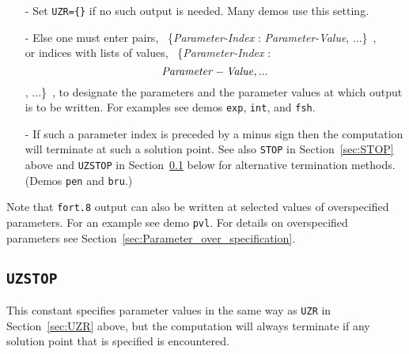 \documentclass[12pt]{report}
\begin{document}
\begin{itemize}
\item[-]
 Set {\tt UZR=\{\}} if no such output is needed. Many demos use this setting.
\item[-]
 Else one must enter pairs,
            ~\{{\it Parameter-Index} : {\it Parameter-Value}, ...\}~,\\
 or indices with lists of values,
            ~\{{\it Parameter-Index} : \[{\it Parameter-Value}, ...\], ...\}~,
 to designate the parameters and the parameter
 values at which output is to be written.
 For examples see demos {\tt exp}, {\tt int}, and {\tt fsh}.
\item[-]
 If such a parameter index is preceded by a minus sign then the computation will
 terminate at such a solution point. See also \texttt{STOP} in
 Section~\ref{sec:STOP} above and \texttt{UZSTOP} in
 Section~\ref{sec:UZSTOP} below for alternative termination methods.
 (Demos {\tt pen} and {\tt bru}.)
\end{itemize}

Note that {\tt fort.8} output can also be written at selected values of 
overspecified parameters. For an example see demo {\tt pvl}.
For details on overspecified parameters see 
Section~\ref{sec:Parameter_over_specification}.

\subsection{\texttt{UZSTOP}} \label{sec:UZSTOP}
 This constant specifies parameter values in the same way as
 \texttt{UZR} in Section~\ref{sec:UZR} above, but the computation
 will always terminate if any solution point that is specified is
 encountered.

\end{document}
